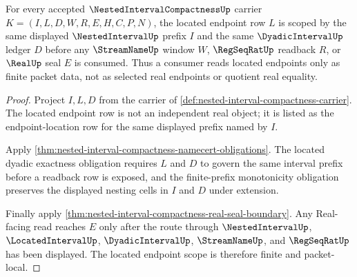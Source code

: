\begin{theorem}
\label{thm:nested-interval-compactness-located-endpoint-scope}
For every accepted $\NestedIntervalCompactnessUp$ carrier $K=(I,L,D,W,R,E,H,C,P,N)$, the located endpoint row $L$ is scoped by the same displayed $\NestedIntervalUp$ prefix $I$ and the same $\DyadicIntervalUp$ ledger $D$ before any $\StreamNameUp$ window $W$, $\RegSeqRatUp$ readback $R$, or $\RealUp$ seal $E$ is consumed. Thus a consumer reads located endpoints only as finite packet data, not as selected real endpoints or quotient real equality.
\end{theorem}
\begin{proof}
Project $I,L,D$ from the carrier of \autoref{def:nested-interval-compactness-carrier}. The located endpoint row is not an independent real object; it is listed as the endpoint-location row for the same displayed prefix named by $I$.

Apply \autoref{thm:nested-interval-compactness-namecert-obligations}. The located dyadic exactness obligation requires $L$ and $D$ to govern the same interval prefix before a readback row is exposed, and the finite-prefix monotonicity obligation preserves the displayed nesting cells in $I$ and $D$ under extension.

Finally apply \autoref{thm:nested-interval-compactness-real-seal-boundary}. Any Real-facing read reaches $E$ only after the route through $\NestedIntervalUp$, $\LocatedIntervalUp$, $\DyadicIntervalUp$, $\StreamNameUp$, and $\RegSeqRatUp$ has been displayed. The located endpoint scope is therefore finite and packet-local.
\end{proof}

